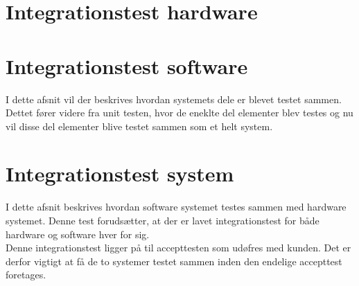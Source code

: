 \section{Integrationstest hardware}


\section{Integrationstest software}
I dette afsnit vil der beskrives hvordan systemets dele er blevet testet sammen. Dettet fører videre fra unit testen, hvor de eneklte del elementer blev testes og nu vil disse del elementer blive testet sammen som et helt system. 

\section{Integrationstest system}
I dette afsnit beskrives hvordan software systemet testes sammen med hardware systemet. Denne test forudsætter, at der er lavet integrationstest for både hardware og software hver for sig. \\
Denne integrationstest ligger på til accepttesten som udøfres med kunden. Det er derfor vigtigt at få de to systemer testet sammen inden den endelige accepttest foretages. 

